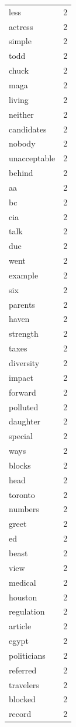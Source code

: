\begin{tabular}{lr}
less & 2 \\
actress & 2 \\
simple & 2 \\
todd & 2 \\
chuck & 2 \\
maga & 2 \\
living & 2 \\
neither & 2 \\
candidates & 2 \\
nobody & 2 \\
unacceptable & 2 \\
behind & 2 \\
aa & 2 \\
bc & 2 \\
cia & 2 \\
talk & 2 \\
due & 2 \\
went & 2 \\
example & 2 \\
six & 2 \\
parents & 2 \\
haven & 2 \\
strength & 2 \\
taxes & 2 \\
diversity & 2 \\
impact & 2 \\
forward & 2 \\
polluted & 2 \\
daughter & 2 \\
special & 2 \\
ways & 2 \\
blocks & 2 \\
head & 2 \\
toronto & 2 \\
numbers & 2 \\
greet & 2 \\
ed & 2 \\
beast & 2 \\
view & 2 \\
medical & 2 \\
houston & 2 \\
regulation & 2 \\
article & 2 \\
egypt & 2 \\
politicians & 2 \\
referred & 2 \\
travelers & 2 \\
blocked & 2 \\
record & 2 \\

\end{tabular}
